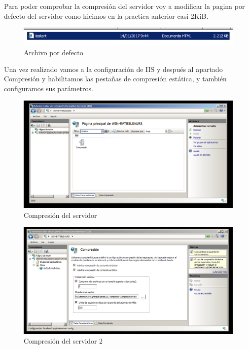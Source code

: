 Para poder comprobar la compresión del servidor voy a modificar la pagina por defecto del servidor como hicimos en la practica anterior casi 2KiB.

\begin{figure}[H] %
	\centering
	\includegraphics[scale=0.5]{pics/2}  %
	\caption{Archivo por defecto} \label{fig:1}
\end{figure}

Una vez realizado vamos a la configuración de IIS y después al apartado Compresión y habilitamos las pestañas de compresión estática, y también configuramos sus parámetros.

\begin{figure}[H] %
	\centering
	\includegraphics[scale=0.5]{pics/1}  %
	\caption{Compresión del servidor} \label{fig:2}
\end{figure}

\begin{figure}[H] %
	\centering
	\includegraphics[scale=0.5]{pics/3}  %
	\caption{Compresión del servidor 2} \label{fig:3}
\end{figure}


